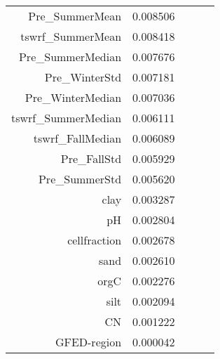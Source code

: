 \begin{tabular}{rrrrr}
Pre_SummerMean & 0.008506 \\
tswrf_SummerMean & 0.008418 \\
Pre_SummerMedian & 0.007676 \\
Pre_WinterStd & 0.007181 \\
Pre_WinterMedian & 0.007036 \\
tswrf_SummerMedian & 0.006111 \\
tswrf_FallMedian & 0.006089 \\
Pre_FallStd & 0.005929 \\
Pre_SummerStd & 0.005620 \\
clay & 0.003287 \\
pH & 0.002804 \\
cellfraction & 0.002678 \\
sand & 0.002610 \\
orgC & 0.002276 \\
silt & 0.002094 \\
CN & 0.001222 \\
GFED-region & 0.000042 \\
\bottomrule
\end{tabular}
